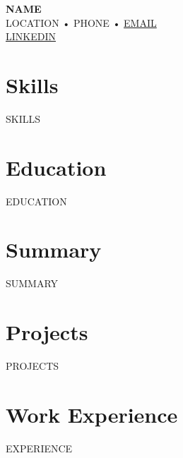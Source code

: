 \documentclass[11pt]{article}
\begin{document}
\noindent
\textbf{\LARGE {{NAME}}} \\
{{LOCATION}} • {{PHONE}} • \href{mailto:{{EMAIL}}}{{{{EMAIL}}}} \\
\href{{{{LINKEDIN}}}}{{{{LINKEDIN}}}}

\section*{Skills}
{{SKILLS}}

\section*{Education}
{{EDUCATION}}

\section*{Summary}
{{SUMMARY}}

\section*{Projects}
{{PROJECTS}}

\section*{Work Experience}
{{EXPERIENCE}}
\end{document}
